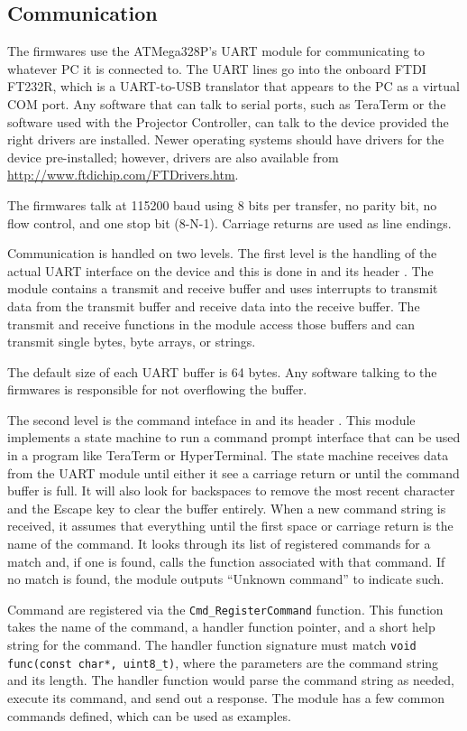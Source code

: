 \documentclass{article}
\begin{document}
\subsection{Communication} \label{ssec:FWComm}
The firmwares use the ATMega328P's UART module for communicating to whatever PC it is connected to.
The UART lines go into the onboard FTDI FT232R, which is a UART-to-USB translator that appears to
the PC as a virtual COM port.  Any software that can talk to serial ports, such as TeraTerm or the
software used with the Projector Controller, can talk to the device provided the right drivers are
installed.  Newer operating systems should have drivers for the device pre-installed; however,
drivers are also available from \url{http://www.ftdichip.com/FTDrivers.htm}.

The firmwares talk at 115200 baud using 8 bits per transfer, no parity bit, no flow control, and one
stop bit (8-N-1).  Carriage returns are used as line endings.

Communication is handled on two levels.  The first level is the handling of the actual UART
interface on the device and this is done in  and its header
.  The module contains a transmit and receive buffer and uses interrupts to transmit
data from the transmit buffer and receive data into the receive buffer.  The transmit and receive
functions in the module access those buffers and can transmit single bytes, byte arrays, or strings.

The default size of each UART buffer is 64 bytes.  Any software talking to the firmwares is
responsible for not overflowing the buffer.

The second level is the command inteface in  and its header
. This module implements a state machine to run a command prompt interface that can be
used in a program like TeraTerm or HyperTerminal.  The state machine receives data from the UART
module until either it see a carriage return or until the command buffer is full.  It will also look
for backspaces to remove the most recent character and the Escape key to clear the buffer entirely.
When a new command string is received, it assumes that everything until the first space or carriage
return is the name of the command.  It looks through its list of registered commands for a match
and, if one is found, calls the function associated with that command.  If no match is found, the
module outputs ``Unknown command'' to indicate such.

Command are registered via the \texttt{Cmd\_RegisterCommand} function.  This function takes the name
of the command, a handler function pointer, and a short help string for the command.  The handler
function signature must match \texttt{void func(const char*, uint8\_t)}, where the parameters are the
command string and its length.  The handler function would parse the command string as needed,
execute its command, and send out a response.  The module has a few common commands defined, which
can be used as examples.
\end{document}
